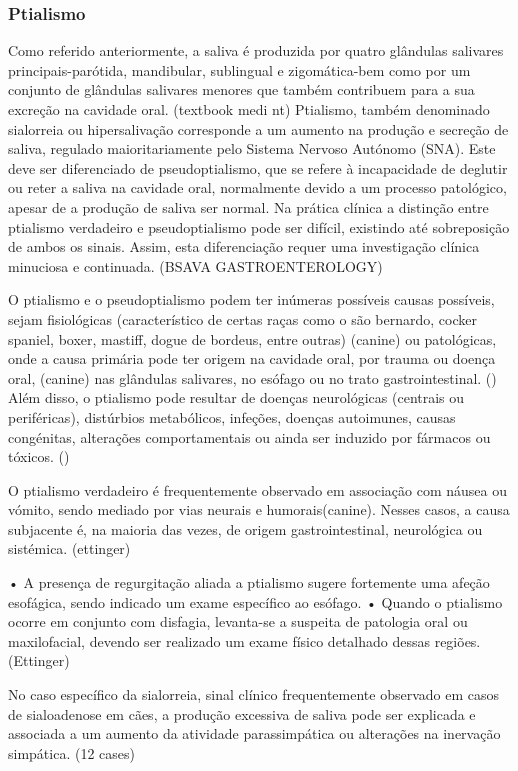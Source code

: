 \subsubsection{Ptialismo} 

Como referido anteriormente, a saliva é produzida por quatro glândulas salivares principais-parótida, mandibular, sublingual e zigomática-bem como por um conjunto de glândulas salivares menores que também contribuem para a sua excreção na cavidade oral. (textbook medi nt)
Ptialismo, também denominado sialorreia ou hipersalivação corresponde a um aumento na produção e secreção de saliva, regulado maioritariamente pelo Sistema Nervoso Autónomo (SNA). Este deve ser diferenciado de pseudoptialismo, que se refere à incapacidade de deglutir ou reter a saliva na cavidade oral, normalmente devido a um processo patológico, apesar de a produção de saliva ser normal.
 Na prática clínica a distinção entre ptialismo verdadeiro e pseudoptialismo pode ser difícil, existindo até sobreposição de ambos os sinais. Assim, esta diferenciação requer uma investigação clínica minuciosa e continuada. (BSAVA GASTROENTEROLOGY)


O ptialismo e o pseudoptialismo podem ter inúmeras possíveis causas possíveis, sejam fisiológicas (característico de certas raças como o são bernardo, cocker spaniel, boxer, mastiff, dogue de bordeus, entre outras) (canine) ou patológicas, onde a causa primária pode ter origem na cavidade oral, por trauma ou doença oral, (canine) nas glândulas salivares, no esófago ou no trato gastrointestinal. (\cite{Ptyalism}) Além disso, o ptialismo pode resultar de doenças neurológicas (centrais ou periféricas), distúrbios metabólicos, infeções, doenças autoimunes, causas congénitas, alterações comportamentais ou ainda ser induzido por fármacos ou tóxicos. (\cite{Ptyalism}) 


O ptialismo verdadeiro é frequentemente observado em associação com náusea ou vómito, sendo mediado por vias neurais e humorais(canine). Nesses casos, a causa subjacente é, na maioria das vezes, de origem gastrointestinal, neurológica ou sistémica. (ettinger)


•	A presença de regurgitação aliada a ptialismo sugere fortemente uma afeção esofágica, sendo indicado um exame específico ao esófago.
•	Quando o ptialismo ocorre em conjunto com disfagia, levanta-se a suspeita de patologia oral ou maxilofacial, devendo ser realizado um exame físico detalhado dessas regiões. (Ettinger)


No caso específico da sialorreia, sinal clínico frequentemente observado em casos de sialoadenose em cães, a produção excessiva de saliva pode ser explicada e associada a um aumento da atividade parassimpática ou alterações na inervação simpática. (12 cases) 


